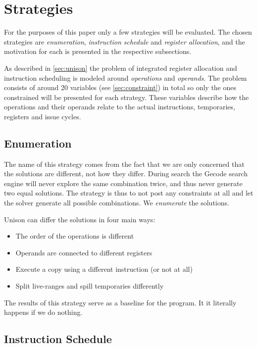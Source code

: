 \section{Strategies}

For the purposes of this paper only a few strategies will be evaluated. The chosen
strategies are \textit{enumeration}, \textit{instruction schedule} and
\textit{register allocation}, and the motivation for each is presented in the respective
subsections.

As described in \ref{sec:unison} the problem of integrated register allocation and
instruction scheduling is modeled around \textit{operations} and \textit{operands}. The
problem consists of around 20 variables (see \ref{sec:constraint}) in total so only the
ones constrained will be presented for each strategy. These variables describe how the
operations and their operands relate to the actual instructions, temporaries, registers
and issue cycles.

\subsection{Enumeration}

The name of this strategy comes from the fact that we are only concerned that the solutions
are different, not how they differ. During search the Gecode search engine will never
explore the same combination twice, and thus never generate two equal solutions. The
strategy is thus to not post any constraints at all and let the solver generate all
possible combinations. We \textit{enumerate} the solutions.

Unison can differ the solutions in four main ways:

\begin{itemize}
	\item The order of the operations is different
	\item Operands are connected to different registers
	\item Execute a copy using a different instruction (or not at all)
	\item Split live-ranges and spill temporaries differently
\end{itemize}

The results of this strategy serve as a baseline for the program. It it literally happens
if we do nothing.

\subsection{Instruction Schedule}

